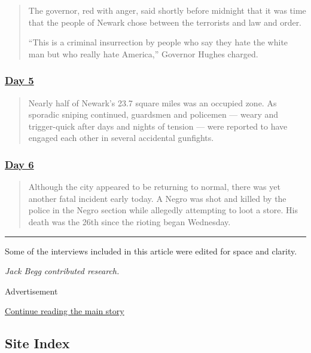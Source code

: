 \begin{quote}
The governor, red with anger, said shortly before midnight that it was
time that the people of Newark chose between the terrorists and law and
order.

``This is a criminal insurrection by people who say they hate the white
man but who really hate America,'' Governor Hughes charged.~
\end{quote}

\hypertarget{day-5}{%
\subsubsection{\texorpdfstring{\href{https://timesmachine.nytimes.com/timesmachine/1967/07/17/90374734.html?pageNumber=1}{Day
5}}{Day 5}}\label{day-5}}

\begin{quote}
Nearly half of Newark's 23.7 square miles was an occupied zone. As
sporadic sniping continued, guardsmen and policemen --- weary and
trigger-quick after days and nights of tension --- were reported to have
engaged each other in several accidental gunfights.
\end{quote}

\hypertarget{day-6}{%
\subsubsection{\texorpdfstring{\href{https://timesmachine.nytimes.com/timesmachine/1967/07/18/90375517.html?pageNumber=1}{Day
6}}{Day 6}}\label{day-6}}

\begin{quote}
Although the city appeared to be returning to normal, there was yet
another fatal incident early today. A Negro was shot and killed by the
police in the Negro section while allegedly attempting to loot a store.
His death was the 26th since the rioting began Wednesday.
\end{quote}

\begin{center}\rule{0.5\linewidth}{\linethickness}\end{center}

Some of the interviews included in this article were edited for space
and clarity.

\emph{Jack Begg contributed research.}

Advertisement

\protect\hyperlink{after-bottom}{Continue reading the main story}

\hypertarget{site-index}{%
\subsection{Site Index}\label{site-index}}

